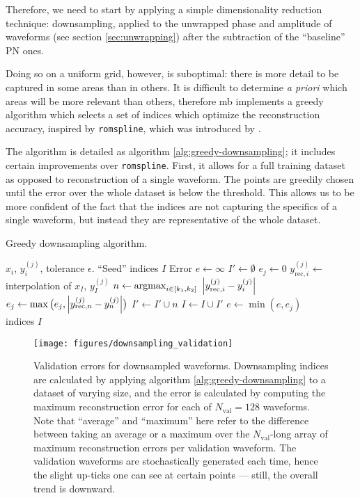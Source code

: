 \documentclass[main.tex]{subfiles}
\begin{document}
Therefore, we need to start by applying a simple dimensionality reduction technique: downsampling, applied to the unwrapped phase and amplitude of waveforms (see section \ref{sec:unwrapping}) after the subtraction of the ``baseline'' \ac{PN} ones.

Doing so on a uniform grid, however, is suboptimal: there is more detail to be captured in some areas than in others. 
It is difficult to determine \emph{a priori} which areas will be more relevant than others, therefore \ac{mb} implements a greedy algorithm which selects a set of indices which optimize the reconstruction accuracy, inspired by \texttt{romspline}, which was introduced by
\textcite{galleyFastEfficientEvaluation2016}.

The algorithm is detailed as algorithm \ref{alg:greedy-downsampling}; it includes certain improvements over \texttt{romspline}. 
First, it allows for a full training dataset as opposed to reconstruction of a single waveform. The points are greedily chosen until the error over the whole dataset is below the threshold.
This allows us to be more confident of the fact that the indices are not capturing the specifics of a single waveform, but instead they are representative of the whole dataset.

\begin{algorithm}
\caption{Greedy downsampling algorithm. }\label{alg:greedy-downsampling}
\begin{algorithmic}
\Require \(x_i\), \(y_i^{(j)}\), tolerance \(\epsilon \).
\Require ``Seed'' indices \(I\)
\State Error \(e \gets \infty \)
\State \(I' \gets \emptyset\)
\State \( e_j \gets 0\)
\State \(y_{\text{rec}, i}^{(j)} \gets\) interpolation of \(x_I\), \(y_I^{(j)}\)
\State \(n \gets \operatorname{argmax}_{i \in [k_1 , k_2 ]} \ \abs{y _{\text{rec}, i}^{(j)} - y_{i}^{(j)}}\)
\State \(e_j \gets \max \big( e_j, \abs{y _{\text{rec}, n}^{(j)} - y_{n}^{(j)}}\big)\)
\State \(I' \gets I' \cup n\)
\EndIf
\State \(I \gets I \cup I'\)
\EndFor
\State \(e \gets \min (e, e_j)\)
\EndFor
\EndWhile \\
\Return indices \(I\)
\end{algorithmic}
\end{algorithm}

\begin{figure}[ht]
\centering
\texttt{[image: figures/downsampling\_validation]}
\caption{Validation errors for downsampled waveforms. Downsampling indices are calculated by applying algorithm \ref{alg:greedy-downsampling} to a dataset of varying size, and the error is calculated by computing the maximum reconstruction error for each of \(N _{\text{val}} = 128\) waveforms. Note that ``average'' and ``maximum'' here refer to the difference between taking an average or a maximum over the \(N _{\text{val}}\)-long array of maximum reconstruction errors per validation waveform. The validation waveforms are stochastically generated each time, hence the slight up-ticks one can see at certain points --- still, the overall trend is downward.}
\label{fig:downsampling_validation}
\end{figure}
\end{document}
